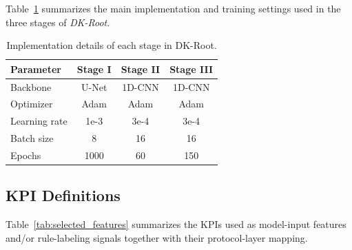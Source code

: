 \documentclass[lettersize,journal]{IEEEtran}
\begin{document}
{{Table~\ref{tab:implementation} summarizes the main implementation and training settings used in the three stages of \textit{DK-Root}.

\begin{table}[!t]
\centering
\caption{{\color{R3color}Implementation details of each stage in DK-Root.}}
\label{tab:implementation}
\scriptsize
\begin{tabular}{l|ccc}
\toprule
    \textbf{Parameter} & \textbf{Stage I} & \textbf{Stage II} & \textbf{Stage III} \\
\midrule
Backbone      & U-Net   & 1D-CNN  & 1D-CNN \\
Optimizer     & Adam    & Adam    & Adam \\
Learning rate & 1e-3    & 3e-4    & 3e-4 \\
Batch size    & 8       & 16      & 16 \\
Epochs        & 1000    & 60      & 150 \\
\bottomrule
\end{tabular}
\end{table}

\subsection{KPI Definitions}

Table~\ref{tab:selected_features} summarizes the KPIs used as model-input features and/or rule-labeling signals together with their protocol-layer mapping.

}}
\end{document}
